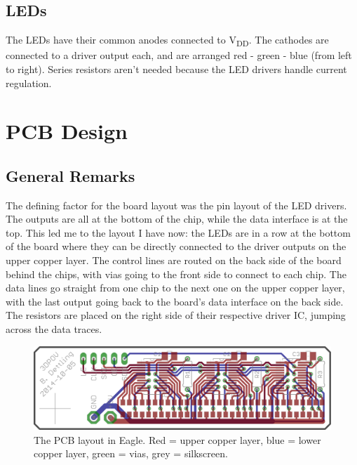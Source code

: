 \documentclass[a4paper, 11pt, titlepage]{report}
\def \vdd {V\textsubscript{DD}}
\begin{document}
\subsection{LEDs}

The LEDs have their common anodes connected to \vdd. The cathodes are connected to a driver output
each, and are arranged red - green - blue (from left to right). Series resistors aren't needed
because the LED drivers handle current regulation.












\section{PCB Design}

\subsection{General Remarks}

The defining factor for the board layout was the pin layout of the LED drivers. The outputs are
all at the bottom of the chip, while the data interface is at the top. This led me to the layout I
have now: the LEDs are in a row at the bottom of the board where they can be directly connected to
the driver outputs on the upper copper layer. The control lines are routed on the back side of
the board behind the chips, with vias going to the front side to connect to each chip. The data
lines go straight from one chip to the next one on the upper copper layer, with the last output
going back to the board's data interface on the back side. The resistors are placed on the right
side of their respective driver IC, jumping across the data traces.

\begin{figure}[h]
\vspace{4mm}
\includegraphics[width=\textwidth]{./images/board-layout.png}
\vspace{-6mm}
\caption{The PCB layout in Eagle. Red = upper copper layer, blue = lower copper layer,
green = vias, grey = silkscreen.}
\vspace{-3mm}
\end{figure}
\end{document}
